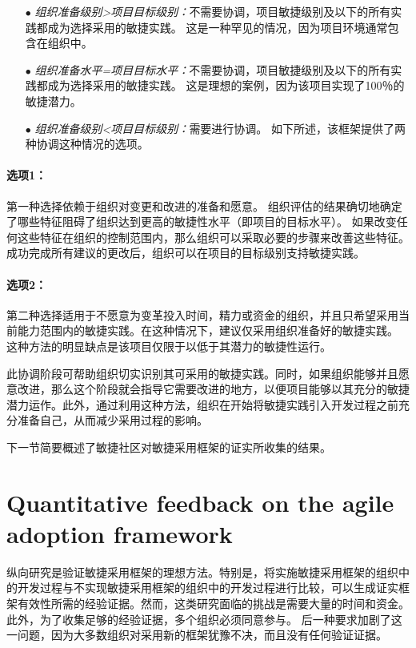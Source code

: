 \documentclass[twocolumn]{svjour3}[]
\begin{document}
\begin{itemize}
    \item[$\bullet$] \textit{组织准备级别>项目目标级别：}不需要协调，项目敏捷级别及以下的所有实践都成为选择采用的敏捷实践。 这是一种罕见的情况，因为项目环境通常包含在组织中。
    \item[$\bullet$] \textit{组织准备水平=项目目标水平：}不需要协调，项目敏捷级别及以下的所有实践都成为选择采用的敏捷实践。 这是理想的案例，因为该项目实现了100％的敏捷潜力。
    \item[$\bullet$] \textit{组织准备级别<项目目标级别：}需要进行协调。 如下所述，该框架提供了两种协调这种情况的选项。
\end{itemize}

\paragraph{选项1：}

第一种选择依赖于组织对变更和改进的准备和愿意。 组织评估的结果确切地确定了哪些特征阻碍了组织达到更高的敏捷性水平（即项目的目标水平）。 如果改变任何这些特征在组织的控制范围内，那么组织可以采取必要的步骤来改善这些特征。 成功完成所有建议的更改后，组织可以在项目的目标级别支持敏捷实践。

\paragraph{选项2：}

第二种选择适用于不愿意为变革投入时间，精力或资金的组织，并且只希望采用当前能力范围内的敏捷实践。在这种情况下，建议仅采用组织准备好的敏捷实践。 这种方法的明显缺点是该项目仅限于以低于其潜力的敏捷性运行。

此协调阶段可帮助组织切实识别其可采用的敏捷实践。同时，如果组织能够并且愿意改进，那么这个阶段就会指导它需要改进的地方，以便项目能够以其充分的敏捷潜力运作。此外，通过利用这种方法，组织在开始将敏捷实践引入开发过程之前充分准备自己，从而减少采用过程的影响。

下一节简要概述了敏捷社区对敏捷采用框架的证实所收集的结果。

\section{Quantitative feedback on the agile adoption framework}

纵向研究是验证敏捷采用框架的理想方法。特别是，将实施敏捷采用框架的组织中的开发过程与不实现敏捷采用框架的组织中的开发过程进行比较，可以生成证实框架有效性所需的经验证据。然而，这类研究面临的挑战是需要大量的时间和资金。此外，为了收集足够的经验证据，多个组织必须同意参与。 后一种要求加剧了这一问题，因为大多数组织对采用新的框架犹豫不决，而且没有任何验证证据。
\end{document}
